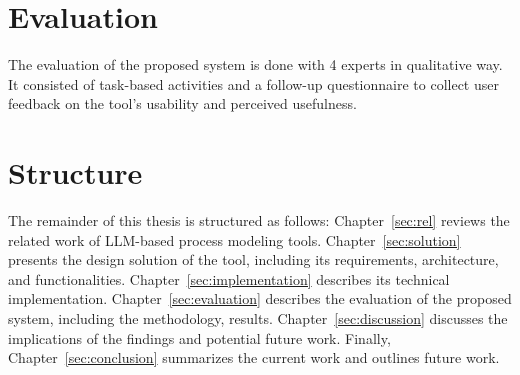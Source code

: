 \section{Evaluation}
\label{sec:intro:ev}
The evaluation of the proposed system is done with 4 experts in qualitative way. It consisted of task-based activities and a follow-up questionnaire to collect user feedback on the tool's usability and perceived usefulness.

\section{Structure}
\label{sec:intro:struct}

The remainder of this thesis is structured as follows: Chapter~\ref{sec:rel} reviews the related work of LLM-based process modeling tools. Chapter~\ref{sec:solution} presents the design solution of the tool, including its requirements, architecture, and functionalities. Chapter~\ref{sec:implementation} describes its technical implementation. Chapter~\ref{sec:evaluation} describes the evaluation of the proposed system, including the methodology, results. Chapter~\ref{sec:discussion} discusses the implications of the findings and potential future work. Finally, Chapter~\ref{sec:conclusion} summarizes the current work and outlines future work.
